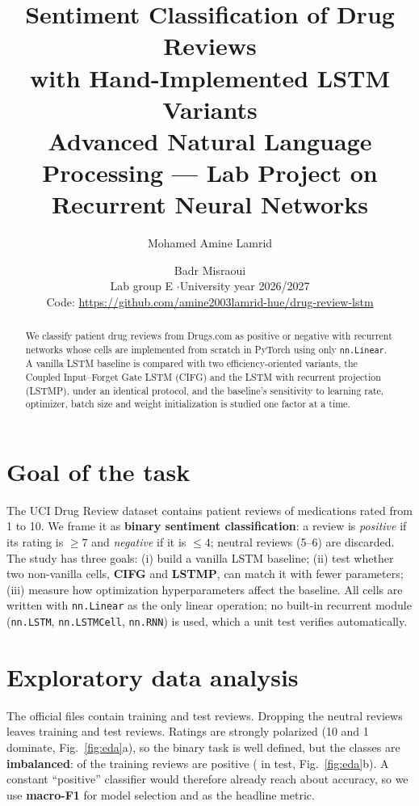 \documentclass[10pt,a4paper]{article}
\title{\vspace{-1.2cm}\textbf{Sentiment Classification of Drug Reviews\\with Hand-Implemented LSTM Variants}\\[0.3em]
\large Advanced Natural Language Processing --- Lab Project on Recurrent Neural Networks}
\author{Mohamed Amine Lamrid \and Badr Misraoui\\[0.2em]
\small Lab group E \quad$\cdot$\quad University year 2026/2027\\
\small Code: \url{https://github.com/amine2003lamrid-hue/drug-review-lstm}}
\date{}
\begin{document}
\maketitle
\vspace{-1.0cm}

\begin{abstract}
\noindent We classify patient drug reviews from Drugs.com as positive or negative with recurrent networks whose
cells are implemented from scratch in PyTorch using only \texttt{nn.Linear}. A vanilla LSTM baseline is compared with
two efficiency-oriented variants, the Coupled Input--Forget Gate LSTM (CIFG) and the LSTM with recurrent projection
(LSTMP), under an identical protocol, and the baseline's sensitivity to learning rate, optimizer, batch size and weight
initialization is studied one factor at a time. \AbstractResult
\end{abstract}

\section{Goal of the task}
The UCI Drug Review dataset contains patient reviews of medications rated from 1 to 10. We frame it as
\textbf{binary sentiment classification}: a review is \emph{positive} if its rating is $\geq 7$ and \emph{negative} if
it is $\leq 4$; neutral reviews (5--6) are discarded. The study has three goals: (i) build a vanilla LSTM baseline;
(ii) test whether two non-vanilla cells, \textbf{CIFG} and \textbf{LSTMP}, can match it with fewer parameters;
(iii) measure how optimization hyperparameters affect the baseline. All cells are written with \texttt{nn.Linear} as
the only linear operation; no built-in recurrent module (\texttt{nn.LSTM}, \texttt{nn.LSTMCell}, \texttt{nn.RNN}) is
used, which a unit test verifies automatically.

\section{Exploratory data analysis}
The official files contain \NTrainRaw{} training and \NTestRaw{} test reviews. Dropping the \Dropped{} neutral reviews
leaves \NTrainKept{} training and \NTestKept{} test reviews. Ratings are strongly polarized (10 and 1 dominate,
Fig.~\ref{fig:eda}a), so the binary task is well defined, but the classes are \textbf{imbalanced}: \PosTrain{} of the
training reviews are positive (\PosTest{} in test, Fig.~\ref{fig:eda}b). A constant ``positive'' classifier would
therefore already reach about \PosTest{} accuracy, so we use \textbf{macro-F1} for model selection and as the headline
metric.
\end{document}
